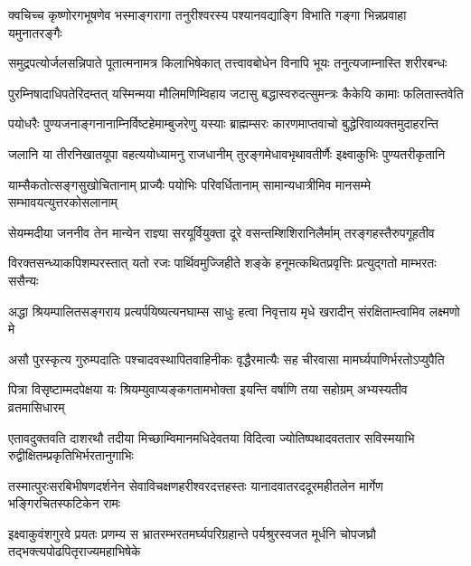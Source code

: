 \fourlineindentedshloka
{क्वचिच्च कृष्णोरगभूषणेव}
{भस्माङ्गरागा तनुरीश्वरस्य}
{पश्यानवद्याङ्गि विभाति गङ्गा}
{भिन्नप्रवाहा यमुनातरङ्गैः} %

\fourlineindentedshloka
{समुद्रपत्योर्जलसन्निपाते}
{पूतात्मनामत्र किलाभिषेकात्}
{तत्त्वावबोधेन विनापि भूयः}
{तनुत्यजाम्नास्ति शरीरबन्धः} %

\fourlineindentedshloka
{पुरम्निषादाधिपतेरिदम्तत्}
{यस्मिन्मया मौलिमणिम्विहाय}
{जटासु बद्धास्वरुदत्सुमन्त्रः}
{कैकेयि कामाः फलितास्तवेति} %

\twolineshloka
{पयोधरैः पुण्यजनाङ्गनानाम्निर्विष्टहेमाम्बुजरेणु यस्याः}
{ब्राह्मम्सरः कारणमाप्तवाचो बुद्धेरिवाव्यक्तमुदाहरन्ति} %

\fourlineindentedshloka
{जलानि या तीरनिखातयूपा}
{वहत्ययोध्यामनु राजधानीम्}
{तुरङ्गमेधावभृथावतीर्णैः}
{इक्ष्वाकुभिः पुण्यतरीकृतानि} %

\fourlineindentedshloka
{याम्सैकतोत्सङ्गसुखोचितानाम्}
{प्राज्यैः पयोभिः परिवर्धितानाम्}
{सामान्यधात्रीमिव मानसम्मे}
{सम्भावयत्युत्तरकोसलानाम्} %

\fourlineindentedshloka
{सेयम्मदीया जननीव तेन}
{मान्येन राज्ञ्या सरयूर्वियुक्ता}
{दूरे वसन्तम्शिशिरानिलैर्माम्}
{तरङ्गहस्तैरुपगूहतीव} %

\fourlineindentedshloka
{विरक्तसन्ध्याकपिशम्परस्तात्}
{यतो रजः पार्थिवमुज्जिहीते}
{शङ्के हनूमत्कथितप्रवृत्तिः}
{प्रत्युद्गतो माम्भरतः ससैन्यः} %

\fourlineindentedshloka
{अद्धा श्रियम्पालितसङ्गराय}
{प्रत्यर्पयिष्यत्यनघाम्स साधुः}
{हत्वा निवृत्ताय मृधे खरादीन्}
{संरक्षिताम्त्वामिव लक्ष्मणो मे} %

\fourlineindentedshloka
{असौ पुरस्कृत्य गुरुम्पदातिः}
{पश्चादवस्थापितवाहिनीकः}
{वृद्धैरमात्यैः सह चीरवासा}
{मामर्घ्यपाणिर्भरतोऽप्युपैति} %

\fourlineindentedshloka
{पित्रा विसृष्टाम्मदपेक्षया यः}
{श्रियम्युवाप्यङ्कगतामभोक्ता}
{इयन्ति वर्षाणि तया सहोग्रम्}
{अभ्यस्यतीव व्रतमासिधारम्} %

\fourlineindentedshloka
{एतावदुक्तवति दाशरथौ तदीया}
{मिच्छाम्विमानमधिदेवतया विदित्वा}
{ज्योतिष्पथादवततार सविस्मयाभि}
{रुद्वीक्षितम्प्रकृतिभिर्भरतानुगाभिः} %

\fourlineindentedshloka
{तस्मात्पुरःसरबिभीषणदर्शनेन}
{सेवाविचक्षणहरीश्वरदत्तहस्तः}
{यानादवातरददूरमहीतलेन}
{मार्गेण भङ्गिरचितस्फटिकेन रामः} %

\fourlineindentedshloka
{इक्ष्वाकुवंशगुरवे प्रयतः प्रणम्य}
{स भ्रातरम्भरतमर्घ्यपरिग्रहान्ते}
{पर्यश्रुरस्वजत मूर्धनि चोपजघ्रौ}
{तद्भक्त्यपोढपितृराज्यमहाभिषेके} %

